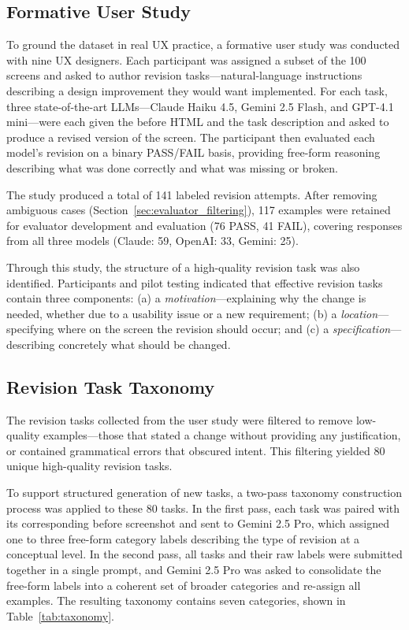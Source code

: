 \documentclass[sigconf,nonacm]{acmart}
\begin{document}
\subsection{Formative User Study}
\label{sec:userstudy}

To ground the dataset in real UX practice, a formative user study was conducted with nine UX designers. Each participant was assigned a subset of the 100 screens and asked to author revision tasks—natural-language instructions describing a design improvement they would want implemented. For each task, three state-of-the-art LLMs—Claude Haiku 4.5, Gemini 2.5 Flash, and GPT-4.1 mini—were each given the before HTML and the task description and asked to produce a revised version of the screen. The participant then evaluated each model's revision on a binary PASS/FAIL basis, providing free-form reasoning describing what was done correctly and what was missing or broken.

The study produced a total of 141 labeled revision attempts. After removing ambiguous cases (Section~\ref{sec:evaluator_filtering}), 117 examples were retained for evaluator development and evaluation (76 PASS, 41 FAIL), covering responses from all three models (Claude: 59, OpenAI: 33, Gemini: 25).

Through this study, the structure of a high-quality revision task was also identified. Participants and pilot testing indicated that effective revision tasks contain three components: (a) a \emph{motivation}—explaining why the change is needed, whether due to a usability issue or a new requirement; (b) a \emph{location}—specifying where on the screen the revision should occur; and (c) a \emph{specification}—describing concretely what should be changed.

\subsection{Revision Task Taxonomy}
\label{sec:taxonomy}

The revision tasks collected from the user study were filtered to remove low-quality examples—those that stated a change without providing any justification, or contained grammatical errors that obscured intent. This filtering yielded 80 unique high-quality revision tasks.

To support structured generation of new tasks, a two-pass taxonomy construction process was applied to these 80 tasks. In the first pass, each task was paired with its corresponding before screenshot and sent to Gemini 2.5 Pro, which assigned one to three free-form category labels describing the type of revision at a conceptual level. In the second pass, all tasks and their raw labels were submitted together in a single prompt, and Gemini 2.5 Pro was asked to consolidate the free-form labels into a coherent set of broader categories and re-assign all examples. The resulting taxonomy contains seven categories, shown in Table~\ref{tab:taxonomy}.
\end{document}
